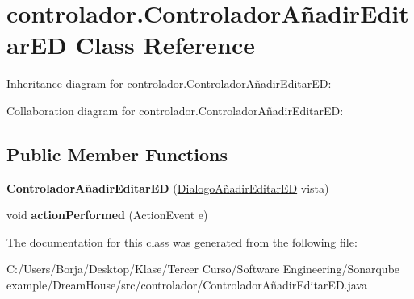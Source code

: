 \hypertarget{classcontrolador_1_1_controlador_a_xC3_xB1adir_editar_e_d}{}\section{controlador.\+Controlador\+Añadir\+Editar\+ED Class Reference}
\label{classcontrolador_1_1_controlador_a_xC3_xB1adir_editar_e_d}


Inheritance diagram for controlador.\+Controlador\+Añadir\+Editar\+ED\+:


Collaboration diagram for controlador.\+Controlador\+Añadir\+Editar\+ED\+:
\subsection*{Public Member Functions}
\begin{DoxyCompactItemize}
\item 
\mbox{\label{classcontrolador_1_1_controlador_a_xC3_xB1adir_editar_e_d_a0fa609c99f3c114987c35f821135d300}} 
{\bfseries Controlador\+Añadir\+Editar\+ED} (\mbox{\hyperlink{classvista_1_1_dialogo_a_xC3_xB1adir_editar_e_d}{Dialogo\+Añadir\+Editar\+ED}} vista)
\item 
\mbox{\label{classcontrolador_1_1_controlador_a_xC3_xB1adir_editar_e_d_a3fd00d9c11231733a48c13b71fd304a6}} 
void {\bfseries action\+Performed} (Action\+Event e)
\end{DoxyCompactItemize}


The documentation for this class was generated from the following file\+:\begin{DoxyCompactItemize}
\item 
C\+:/\+Users/\+Borja/\+Desktop/\+Klase/\+Tercer Curso/\+Software Engineering/\+Sonarqube example/\+Dream\+House/src/controlador/Controlador\+Añadir\+Editar\+E\+D.\+java\end{DoxyCompactItemize}
